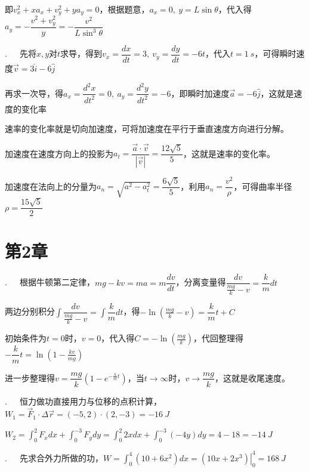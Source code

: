 即$v_x^2+xa_x+v_y^2+ya_y=0$，根据题意，$a_x=0,~y=L\sin{\theta}$，代入得$a_y=-\dfrac{v^2+v_y^2}{y}=-\dfrac{v^2}{L\sin^3{\theta}}$

\noindent\hdashrule{\textwidth}{1pt}{1pt}

.~~~先将$x,y$对$t$求导，得到$v_x=\dfrac{dx}{dt}=3,~v_y=\dfrac{dy}{dt}=-6t$，代入$t=\SI{1}{s}$，可得瞬时速度$\vec{v}=3\hat{i}-6\hat{j}$

再求一次导，得$a_x=\dfrac{d^2x}{dt^2}=0,~a_y=\dfrac{d^2y}{dt^2}=-6$，即瞬时加速度$\vec{a}=-6\hat{j}$，这就是速度的变化率

速率的变化率就是切向加速度，可将加速度在平行于垂直速度方向进行分解。

加速度在速度方向上的投影为$a_t=\dfrac{\vec{a}\cdot \vec{v}}{|\vec{v}|}=\dfrac{12\sqrt{5}}{5}$，这就是速率的变化率。

加速度在法向上的分量为$a_n=\sqrt{a^2-a_t^2}=\dfrac{6\sqrt{5}}{5}$，利用$a_n=\dfrac{v^2}{\rho}$，可得曲率半径$\rho=\dfrac{15\sqrt{5}}{2}$

\noindent\hdashrule{\textwidth}{1pt}{1pt}

\section*{第2章}

.~~~根据牛顿第二定律，$mg-kv=ma=m\dfrac{dv}{dt}$，分离变量得$\dfrac{dv}{\frac{mg}{k}-v}=\dfrac{k}{m}dt$

两边分别积分$\displaystyle\int\dfrac{dv}{\frac{mg}{k}-v}=\int\dfrac{k}{m}dt$，得$-\ln{(\frac{mg}{k}-v)}=\dfrac{k}{m}t+C$

初始条件为$t=0$时，$v=0$，代入得$C=-\ln{(\frac{mg}{k})}$，代回整理得$-\dfrac{k}{m}t=\ln{(1-\frac{kv}{mg})}$

进一步整理得$v=\dfrac{mg}{k}(1-e^{-\frac{k}{m}t})$，当$t\rightarrow \infty$时，$v\rightarrow \dfrac{mg}{k}$，这就是收尾速度。

\noindent\hdashrule{\textwidth}{1pt}{1pt}

.~~~恒力做功直接用力与位移的点积计算，$W_1=\vec{F}_1\cdot \Delta \vec{r}=(-5,2)\cdot (2,-3)=\SI{-16}{J}$

$W_2=\displaystyle\int_0^2{F_xdx}+\int_0^{-3}{F_ydy}=\int_0^2{2xdx}+\int_0^{-3}{(-4y)dy}=4-18=\SI{-14}{J}$

\noindent\hdashrule{\textwidth}{1pt}{1pt}

.~~~先求合外力所做的功，$W=\displaystyle\int_0^4{(10+6x^2)dx}=\left.(10x+2x^3)\right|_0^4=\SI{168}{J}$

